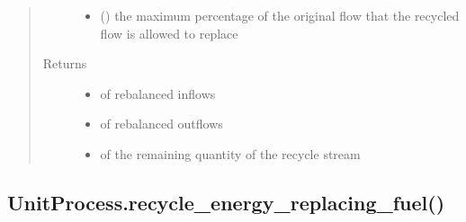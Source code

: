 \documentclass[a4paper,10pt,english]{sphinxmanual}
\begin{document}
\begin{fulllineitems}
\begin{quote}
\begin{description}
\begin{itemize}
\item {} 
 () \textendash{} the maximum percentage of the
original flow that the recycled flow is allowed to replace

\end{itemize}

\item[{Returns}] \leavevmode
\begin{itemize}
\item {} 
 of rebalanced inflows

\item {} 
 of rebalanced outflows

\item {} 
 of the remaining quantity of the recycle stream

\end{itemize}


\end{description}\end{quote}

\end{fulllineitems}



\subsection{UnitProcess.recycle\_energy\_replacing\_fuel()}
\label{\detokenize{unit:unitprocess-recycle-energy-replacing-fuel}}
\end{document}
